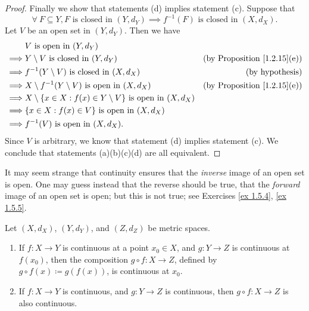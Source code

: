 \begin{proof}
    Finally we show that statements (d) implies statement (c).
    Suppose that
    \[
        \forall\ F \subseteq Y, F \text{ is closed in } (Y, d_Y) \implies f^{-1}(F) \text{ is closed in } (X, d_X).
    \]
    Let \(V\) be an open set in \((Y, d_Y)\).
    Then we have
    \begin{align*}
                 & V \text{ is open in } (Y, d_Y)                                                                                          \\
        \implies & Y \setminus V \text{ is closed in } (Y, d_Y)                                  & \text{(by Proposition \ref{1.2.15}(e))} \\
        \implies & f^{-1}(Y \setminus V) \text{ is closed in } (X, d_X)                          & \text{(by hypothesis)}                  \\
        \implies & X \setminus f^{-1}(Y \setminus V) \text{ is open in } (X, d_X)                & \text{(by Proposition \ref{1.2.15}(e))} \\
        \implies & X \setminus \{x \in X : f(x) \in Y \setminus V\} \text{ is open in } (X, d_X)                                           \\
        \implies & \{x \in X : f(x) \in V\} \text{ is open in } (X, d_X)                                                                   \\
        \implies & f^{-1}(V) \text{ is open in } (X, d_X).
    \end{align*}
    Since \(V\) is arbitrary, we know that statement (d) implies statement (c).
    We conclude that statements (a)(b)(c)(d) are all equivalent.
\end{proof}

\begin{remark}\label{2.1.6}
    It may seem strange that continuity ensures that the \emph{inverse} image of an open set is open.
    One may guess instead that the reverse should be true, that the \emph{forward} image of an open set is open;
    but this is not true;
    see Exercises \ref{ex 1.5.4}, \ref{ex 1.5.5}.
\end{remark}

\begin{corollary}\label{2.1.7}
    Let \((X, d_X)\), \((Y, d_Y)\), and \((Z, d_Z)\) be metric spaces.
    \begin{enumerate}
        \item If \(f : X \to Y\) is continuous at a point \(x_0 \in X\), and \(g : Y \to Z\) is continuous at \(f(x_0)\), then the composition \(g \circ f : X \to Z\), defined by \(g \circ f(x) \coloneqq g(f(x))\), is continuous at \(x_0\).
        \item If \(f : X \to Y\) is continuous, and \(g : Y \to Z\) is continuous, then \(g \circ f : X \to Z\) is also continuous.
    \end{enumerate}
\end{corollary}

